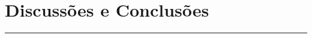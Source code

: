 \chapter{Discussões e Conclusões}\label{chp:conclusao}
\vspace{-1.5cm}
\noindent\rule{\columnwidth}{1.2mm}
\vspace{0.1cm}

